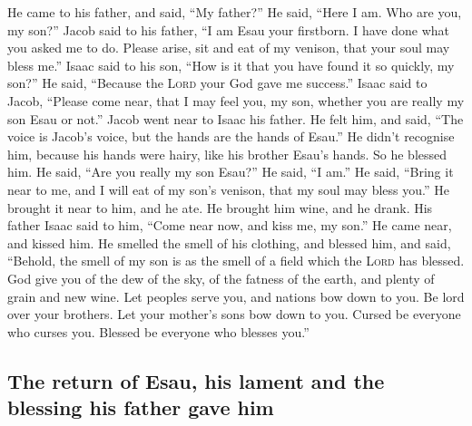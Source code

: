  He came to his father, and said, ``My father?'' He said,
``Here I am. Who are you, my son?''  Jacob said to his
father, ``I am Esau your firstborn. I have done what you asked me to do.
Please arise, sit and eat of my venison, that your soul may bless me.''
 Isaac said to his son, ``How is it that you have found
it so quickly, my son?'' He said, ``Because the \textsc{Lord} your God
gave me success.''  Isaac said to Jacob, ``Please come
near, that I may feel you, my son, whether you are really my son Esau or
not.''  Jacob went near to Isaac his father. He felt him,
and said, ``The voice is Jacob's voice, but the hands are the hands of
Esau.''  He didn't recognise him, because his hands were
hairy, like his brother Esau's hands. So he blessed him. 
He said, ``Are you really my son Esau?'' He said, ``I am.''
 He said, ``Bring it near to me, and I will eat of my
son's venison, that my soul may bless you.'' He brought it near to him,
and he ate. He brought him wine, and he drank.  His
father Isaac said to him, ``Come near now, and kiss me, my son.''
 He came near, and kissed him. He smelled the smell of
his clothing, and blessed him, and said, ``Behold, the smell of my son
is as the smell of a field which the \textsc{Lord} has blessed.
 God give you of the dew of the sky, of the fatness of
the earth, and plenty of grain and new wine.  Let peoples
serve you, and nations bow down to you. Be lord over your brothers. Let
your mother's sons bow down to you. Cursed be everyone who curses you.
Blessed be everyone who blesses you.''

\hypertarget{the-return-of-esau-his-lament-and-the-blessing-his-father-gave-him}{%
\subsection{The return of Esau, his lament and the blessing his father
gave
him}\label{the-return-of-esau-his-lament-and-the-blessing-his-father-gave-him}}

